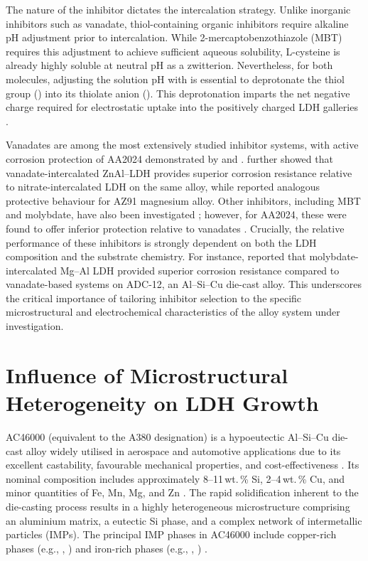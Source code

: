 \documentclass[11pt,twoside,a4paper,final]{report}
\begin{document}
The nature of the inhibitor dictates the intercalation strategy. Unlike inorganic inhibitors such as vanadate, thiol-containing organic inhibitors require alkaline pH adjustment prior to intercalation. While 2-mercaptobenzothiazole (MBT) requires this adjustment to achieve sufficient aqueous solubility, L-cysteine is already highly soluble at neutral pH as a zwitterion. Nevertheless, for both molecules, adjusting the solution pH with  is essential to deprotonate the thiol group () into its thiolate anion (). This deprotonation imparts the net negative charge required for electrostatic uptake into the positively charged LDH galleries \cite{Tedim2010}.

Vanadates are among the most extensively studied inhibitor systems, with active corrosion protection of AA2024 demonstrated by \citet{Tedim2011} and \citet{Yasakau2014}. \citet{Zhang2015} further showed that vanadate-intercalated ZnAl--LDH provides superior corrosion resistance relative to nitrate-intercalated LDH on the same alloy, while \citet{Zhou2017} reported analogous protective behaviour for AZ91 magnesium alloy. Other inhibitors, including MBT and molybdate, have also been investigated \cite{Cao2022, Tedim2010, Zhang2015}; however, for AA2024, these were found to offer inferior protection relative to vanadates \cite{Zhang2015, Tedim2010}. Crucially, the relative performance of these inhibitors is strongly dependent on both the LDH composition and the substrate chemistry. For instance, \citet{Matsui2025} reported that molybdate-intercalated Mg--Al LDH provided superior corrosion resistance compared to vanadate-based systems on ADC-12, an Al--Si--Cu die-cast alloy. This underscores the critical importance of tailoring inhibitor selection to the specific microstructural and electrochemical characteristics of the alloy system under investigation.

\section{Influence of Microstructural Heterogeneity on LDH Growth}
\label{sec:imp_ldh}

AC46000 (equivalent to the A380 designation) is a hypoeutectic Al--Si--Cu die-cast alloy widely utilised in aerospace and automotive applications due to its excellent castability, favourable mechanical properties, and cost-effectiveness \cite{Kasinska2020}. Its nominal composition includes approximately 8--11\,wt.\,\% Si, 2--4\,wt.\,\% Cu, and minor quantities of Fe, Mn, Mg, and Zn \cite{Kasinska2020, Gudic2024}. The rapid solidification inherent to the die-casting process results in a highly heterogeneous microstructure comprising an aluminium matrix, a eutectic Si phase, and a complex network of intermetallic particles (IMPs). The principal IMP phases in AC46000 include copper-rich phases (e.g., , ) and iron-rich phases (e.g., , ) \cite{Gudic2024}. 
\end{document}
